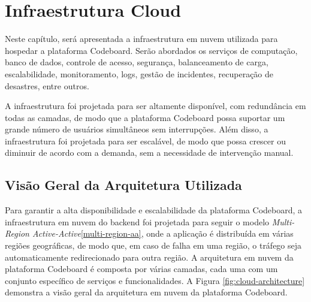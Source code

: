 


\section{Infraestrutura Cloud}

Neste capítulo, será apresentada a infraestrutura em nuvem utilizada para hospedar a plataforma Codeboard. Serão abordados os serviços de computação, banco de dados, controle de acesso, segurança, balanceamento de carga, escalabilidade, monitoramento, logs, gestão de incidentes, recuperação de desastres, entre outros. 

A infraestrutura foi projetada para ser altamente disponível, com redundância em todas as camadas, de modo que a plataforma Codeboard possa suportar um grande número de usuários simultâneos sem interrupções. Além disso, a infraestrutura foi projetada para ser escalável, de modo que possa crescer ou diminuir de acordo com a demanda, sem a necessidade de intervenção manual.

\subsection{Visão Geral da Arquitetura Utilizada}

Para garantir a alta disponibilidade e escalabilidade da plataforma Codeboard, a infraestrutura em nuvem do backend foi projetada para seguir o modelo \emph{Multi-Region Active-Active}\ref{multi-region-aa}, onde a aplicação é distribuída em várias regiões geográficas, de modo que, em caso de falha em uma região, o tráfego seja automaticamente redirecionado para outra região. A arquitetura em nuvem da plataforma Codeboard é composta por várias camadas, cada uma com um conjunto específico de serviços e funcionalidades. A Figura \ref{fig:cloud-architecture} demonstra a visão geral da arquitetura em nuvem da plataforma Codeboard. 

